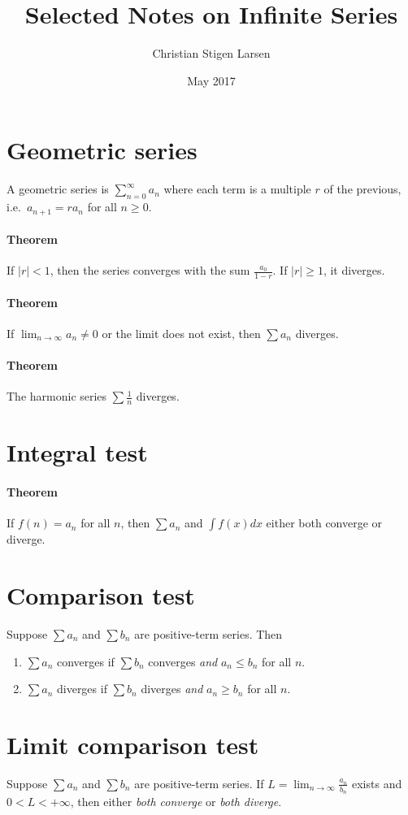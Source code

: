 \documentclass[a4paper,twocolumn,10pt]{article}
\title{Selected Notes on Infinite Series}
\author{Christian Stigen Larsen}
\date{May 2017}
\begin{document}
  \maketitle
  \section{Geometric series}
  A geometric series is $\sum_{n=0}^{\infty} a_n$ where each term is a multiple
  $r$ of the previous, i.e.~$a_{n+1} = ra_n$ for all $n \geq 0$.

  \paragraph{Theorem} If $|r| < 1$, then the series converges with the sum
  $\frac{a_0}{1-r}$. If $|r| \geq 1$, it diverges.

  \paragraph{Theorem} If $\lim_{n \to \infty} a_n \neq 0$ or the limit does not
  exist, then $\sum a_n$ diverges.

  \paragraph{Theorem} The harmonic series $\sum \frac{1}{n}$ diverges.

  \section{Integral test}
  \paragraph{Theorem} If $f(n) = a_n$ for all $n$, then $\sum a_n$ and $\int
  f(x) dx$ either both converge or diverge.

  \section{Comparison test}
  Suppose $\sum a_n$ and $\sum b_n$ are positive-term series. Then
  \begin{enumerate}
    \item $\sum a_n$ converges if $\sum b_n$ converges \textit{and} $a_n \leq
      b_n$ for all $n$.
    \item $\sum a_n$ diverges if $\sum b_n$ diverges \textit{and} $a_n \geq
      b_n$ for all $n$.
  \end{enumerate}

  \section{Limit comparison test}
  Suppose $\sum a_n$ and $\sum b_n$ are positive-term series. If $L =
  \lim_{n\to\infty} \frac{a_n}{b_n}$ exists and $0<L<+\infty$, then either
  \textit{both converge} or \textit{both diverge}.
\end{document}
